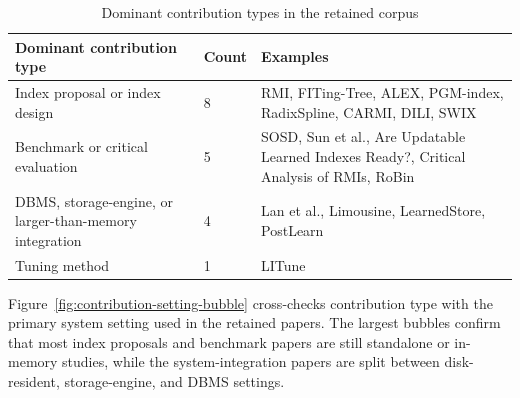 \documentclass[a4paper, 12pt, twoside]{report}
\begin{document}
\begin{table}[h]
\begin{center}
\begin{tabular}{|p{4cm}|p{2cm}|p{7cm}|}
\hline
\textbf{Dominant contribution type} & \textbf{Count} & \textbf{Examples} \\
\hline
Index proposal or index design & 8 & RMI, FITing-Tree, ALEX, PGM-index, RadixSpline, CARMI, DILI, SWIX \cite{kraska2018,galakatos2019fiting,ding2020alex,ferragina2020pgm,kipf2020radixspline,zhang2022carmi,li2023dili,liang2024swix} \\
\hline
Benchmark or critical evaluation & 5 & SOSD, Sun et al., Are Updatable Learned Indexes Ready?, Critical Analysis of RMIs, RoBin \cite{marcus2020benchmarking,sun2023learned,wongkham2022ready,maltry2022critical,luo2025robustness} \\
\hline
DBMS, storage-engine, or larger-than-memory integration & 4 & Lan et al., Limousine, LearnedStore, PostLearn \cite{lan2023disk,chatterjee2024limousine,maharjan2023learnedstore,fuad2026postlearn} \\
\hline
Tuning method & 1 & LITune \cite{wang2025tuning} \\
\hline
\end{tabular}
\end{center}
\caption{Dominant contribution types in the retained corpus}
\label{tab:contribution-types}
\end{table}

Figure~\ref{fig:contribution-setting-bubble} cross-checks contribution type with the primary system setting used in the retained papers. The largest bubbles confirm that most index proposals and benchmark papers are still standalone or in-memory studies, while the system-integration papers are split between disk-resident, storage-engine, and DBMS settings.
\end{document}
